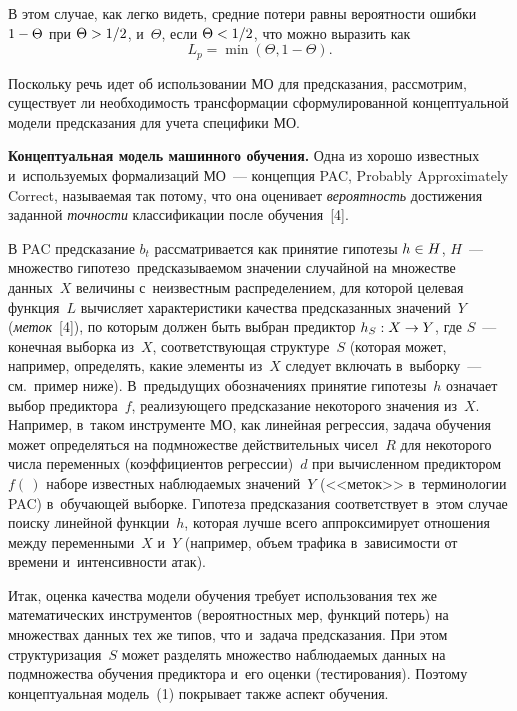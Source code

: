 \begin{multicols}{2}
  В этом случае, как легко видеть, средние потери равны вероятности 
ошибки $1\hm-\Theta$ при $\Theta \hm>1/2$, и~$\Theta$, если $\Theta\hm< 
1/2$, что можно выразить как 
  \begin{equation*}
  L_p=\min \left( \Theta, 1-\Theta\right).
  \end{equation*}
  
  Поскольку речь идет об использовании МО для предсказания, 
рассмотрим, существует ли необходимость трансформации 
сформулированной концептуальной модели предсказания для учета 
специфики МО. 

\smallskip
  
  \textbf{Концептуальная модель машинного обуче\-ния.} Одна из хорошо известных и~используемых формализаций МО~--- концепция PAC, Probably 
Approximately Correct, называемая так потому, что она оценивает 
\textit{ве\-ро\-ят\-ность} достижения заданной \textit{точности} классификации 
после обуче\-ния~[4]. 
  
  В PAC предсказание $b_t$ рассматривается как принятие гипотезы $h\hm\in 
H$, $H$~--- множество гипотез\linebreak о~предсказываемом значении случайной на 
мно\-жестве данных~$X$ величины с~неизвестным распределением, для 
которой целевая функция~$L$ вычисляет характеристики качества 
предсказанных \mbox{значений}~$Y$ (\textit{меток}~[4]), по которым должен быть 
выбран предиктор $h_S : X\hm\to Y$, где $S$~--- конечная выборка из~$X$, 
соответствующая структуре~$S$ (которая может, например, определять, 
какие элементы из~$X$ следует включать в~выборку~--- см.\ пример ниже). 
В~предыдущих обозначениях принятие гипотезы~$h$ означает выбор 
предиктора~$f$, реализующего предсказание некоторого значения из~$X$. 
Например, в~таком инструменте МО, как линейная регрессия, задача 
обучения может определяться на подмножестве действительных чисел~$R$ 
для некоторого чис\-ла переменных (коэффициентов регрессии)~$d$ при 
вычисленном предиктором $f(\,)$ наборе известных наблюдаемых 
значений~$Y$ (<<меток>> в~терминологии PAC) в~обуча\-ющей выборке. 
Гипотеза пред\-ска\-за\-ния соответствует в~этом случае поиску линейной 
функции~$h$, которая луч\-ше всего аппроксимирует отношения между 
переменными~$X$ и~$Y$ (например, объем трафика в~за\-ви\-си\-мости от 
времени и~ин\-тен\-сив\-ности атак).
  
  Итак, оценка качества модели обучения требует использования тех же 
математических инструментов (вероятностных мер, функций потерь) на 
множествах данных тех же типов, что и~задача предсказания. При этом 
структуризация~$S$ может разделять множество наблюдаемых данных на 
подмножества обучения предиктора и~его оценки (тестирования). Поэтому 
концептуальная модель~(1) покрывает также аспект обучения. 
  

\end{multicols}
